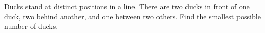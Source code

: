 Ducks stand at distinct positions in a line. There are two ducks in front of one duck, two behind another, and one between two others. Find the smallest possible number of ducks.
